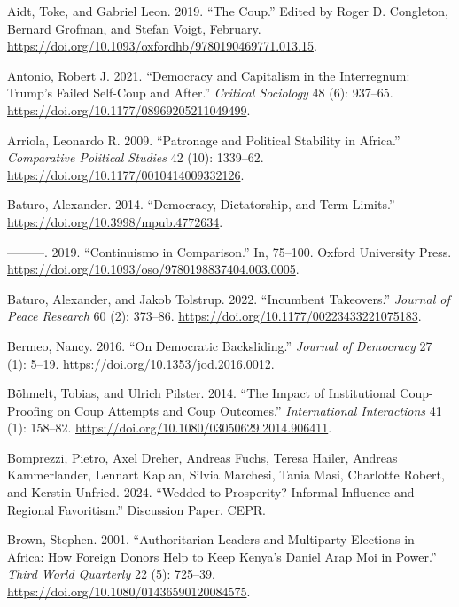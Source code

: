 \documentclass[
  12pt,
]{report}
\newlength{\cslhangindent}
\newenvironment{CSLReferences}[2] %
 {\begin{list}{}{%
  \setlength{\itemindent}{0pt}
  \setlength{\leftmargin}{0pt}
  \setlength{\parsep}{0pt}
  \ifodd #1
   \setlength{\leftmargin}{\cslhangindent}
   \setlength{\itemindent}{-1\cslhangindent}
  \fi
  \setlength{\itemsep}{#2\baselineskip}}}
 {\end{list}}
\begin{document}
\label{refs}
\begin{CSLReferences}{1}{0}
Aidt, Toke, and Gabriel Leon. 2019. {``The Coup.''} Edited by Roger D.
Congleton, Bernard Grofman, and Stefan Voigt, February.
\url{https://doi.org/10.1093/oxfordhb/9780190469771.013.15}.

Antonio, Robert J. 2021. {``Democracy and Capitalism in the Interregnum:
Trump{'}s Failed Self-Coup and After.''} \emph{Critical Sociology} 48
(6): 937--65. \url{https://doi.org/10.1177/08969205211049499}.

Arriola, Leonardo R. 2009. {``Patronage and Political Stability in
Africa.''} \emph{Comparative Political Studies} 42 (10): 1339--62.
\url{https://doi.org/10.1177/0010414009332126}.

Baturo, Alexander. 2014. {``Democracy, Dictatorship, and Term Limits.''}
\url{https://doi.org/10.3998/mpub.4772634}.

---------. 2019. {``Continuismo in Comparison.''} In, 75--100. Oxford
University Press.
\url{https://doi.org/10.1093/oso/9780198837404.003.0005}.

Baturo, Alexander, and Jakob Tolstrup. 2022. {``Incumbent Takeovers.''}
\emph{Journal of Peace Research} 60 (2): 373--86.
\url{https://doi.org/10.1177/00223433221075183}.

Bermeo, Nancy. 2016. {``On Democratic Backsliding.''} \emph{Journal of
Democracy} 27 (1): 5--19. \url{https://doi.org/10.1353/jod.2016.0012}.

Böhmelt, Tobias, and Ulrich Pilster. 2014. {``The Impact of
Institutional Coup-Proofing on Coup Attempts and Coup Outcomes.''}
\emph{International Interactions} 41 (1): 158--82.
\url{https://doi.org/10.1080/03050629.2014.906411}.

Bomprezzi, Pietro, Axel Dreher, Andreas Fuchs, Teresa Hailer, Andreas
Kammerlander, Lennart Kaplan, Silvia Marchesi, Tania Masi, Charlotte
Robert, and Kerstin Unfried. 2024. {``Wedded to Prosperity? Informal
Influence and Regional Favoritism.''} Discussion Paper. CEPR.

Brown, Stephen. 2001. {``Authoritarian Leaders and Multiparty Elections
in Africa: How Foreign Donors Help to Keep Kenya's Daniel Arap Moi in
Power.''} \emph{Third World Quarterly} 22 (5): 725--39.
\url{https://doi.org/10.1080/01436590120084575}.


\end{CSLReferences}
\end{document}
